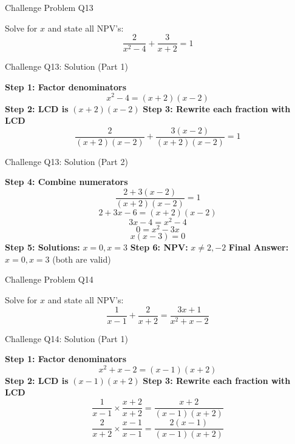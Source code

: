 \documentclass[aspectratio=169]{beamer}
\begin{document}
\begin{frame}{Challenge Problem Q13}
\begin{tcolorbox}[colback=lightgray,colframe=primary,title=Challenge Q13]
\footnotesize
Solve for $x$ and state all NPV's:
\[
\frac{2}{x^2-4} + \frac{3}{x+2} = 1
\]
\end{tcolorbox}
\end{frame}

\begin{frame}{Challenge Q13: Solution (Part 1)}
\begin{tcolorbox}[colback=lightgray,colframe=accent,title=Step-by-Step Solution (Part 1)]
\footnotesize
\textbf{Step 1: Factor denominators}
\[
x^2-4 = (x+2)(x-2)
\]
\textbf{Step 2: LCD is } $(x+2)(x-2)$
\textbf{Step 3: Rewrite each fraction with LCD}
\[
\frac{2}{(x+2)(x-2)} + \frac{3(x-2)}{(x+2)(x-2)} = 1
\]
\end{tcolorbox}
\end{frame}

\begin{frame}{Challenge Q13: Solution (Part 2)}
\begin{tcolorbox}[colback=lightgray,colframe=accent,title=Step-by-Step Solution (Part 2)]
\footnotesize
\textbf{Step 4: Combine numerators}
\[
\frac{2 + 3(x-2)}{(x+2)(x-2)} = 1
\]
\[
2 + 3x - 6 = (x+2)(x-2)
\]
\[
3x - 4 = x^2 - 4
\]
\[
0 = x^2 - 3x
\]
\[
x(x-3) = 0
\]
\textbf{Step 5: Solutions:} $x=0, x=3$
\textbf{Step 6: NPV:} $x \neq 2, -2$
\textbf{Final Answer:} $x=0, x=3$ (both are valid)
\end{tcolorbox}
\end{frame}

\begin{frame}{Challenge Problem Q14}
\begin{tcolorbox}[colback=lightgray,colframe=primary,title=Challenge Q14]
\footnotesize
Solve for $x$ and state all NPV's:
\[
\frac{1}{x-1} + \frac{2}{x+2} = \frac{3x+1}{x^2+x-2}
\]
\end{tcolorbox}
\end{frame}

\begin{frame}{Challenge Q14: Solution (Part 1)}
\begin{tcolorbox}[colback=lightgray,colframe=accent,title=Step-by-Step Solution (Part 1)]
\footnotesize
\textbf{Step 1: Factor denominators}
\[
x^2+x-2 = (x-1)(x+2)
\]
\textbf{Step 2: LCD is } $(x-1)(x+2)$
\textbf{Step 3: Rewrite each fraction with LCD}
\[
\frac{1}{x-1} \times \frac{x+2}{x+2} = \frac{x+2}{(x-1)(x+2)}
\]
\[
\frac{2}{x+2} \times \frac{x-1}{x-1} = \frac{2(x-1)}{(x-1)(x+2)}
\]
\end{tcolorbox}
\end{frame}
\end{document}
